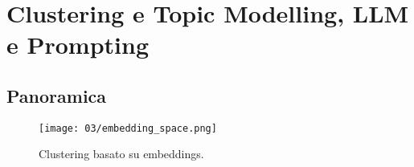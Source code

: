 \chapter{Clustering e Topic Modelling, LLM e Prompting}

\section{Panoramica}

\begin{figure}[h]
    \centering
    \texttt{[image: 03/embedding\_space.png]}
    \caption{Clustering basato su embeddings.}
\end{figure}


